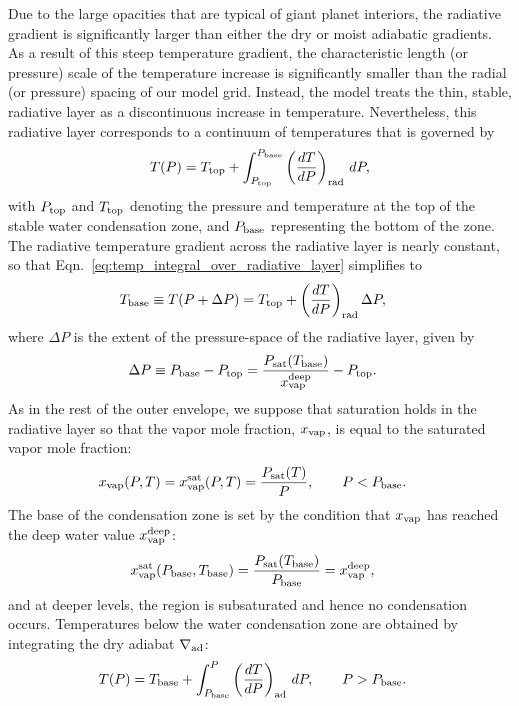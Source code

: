 \documentclass[11pt]{ucscthesisbs}
\begin{document}
Due to the large opacities that are typical of giant planet interiors, the radiative gradient is significantly larger than either the dry or moist adiabatic gradients. As a result of this steep temperature gradient, the characteristic length (or pressure) scale of the temperature increase is significantly smaller than the radial (or pressure) spacing of our model grid. Instead, the model treats the thin, stable, radiative layer as a discontinuous increase in temperature. Nevertheless, this radiative layer corresponds to a continuum of temperatures that is governed by
\begin{equation}
  T(P) = T_{\rm top} + \int_{P_{\rm top}}^{P_{\rm base}} \left(\frac{dT}{dP}\right)_{\rm rad}\,d P ,
  \label{eq:temp_integral_over_radiative_layer}
\end{equation}
with $P_{\rm top}$ and $T_{\rm top}$ denoting the pressure and temperature at the top of the stable water condensation zone, and $P_{\rm base}$ representing the bottom of the zone. The radiative temperature gradient across the radiative layer is nearly constant, so that Eqn.~\ref{eq:temp_integral_over_radiative_layer} simplifies to
\begin{align}
T_{\rm base}\equiv T(P+\Delta P) &= T_{\rm top} + \left(\frac{dT}{dP}\right)_{\rm rad}\Delta P ,
\label{eq:temperature_profile_over_radiative_layer_simplification}
\end{align}
where $\Delta P$ is the extent of the pressure-space of the radiative layer, given by
\begin{align}
\Delta P \equiv P_{\rm base}-P_{\rm top} &= \frac{P_{\rm sat}(T_{\rm base})}{x_{\rm vap}^{\rm deep}} - P_{\rm top}.
\label{eq:delta_P_over_radiative_layer}
\end{align}
As in the rest of the outer envelope, we suppose that saturation holds in the radiative layer so that the vapor mole fraction, $x_{\rm vap}$, is equal to the saturated vapor mole fraction:
\begin{align}
x_{\rm vap}(P, T) &= x_{\rm vap}^{\rm sat}(P, T) = \frac{P_{\rm sat}(T)}{P}, \qquad P<P_{\rm base}.
\label{eq:vapor_mole_fraction_within_condensation_zone}
\end{align}
The base of the condensation zone is set by the condition that $x_{\rm vap}$ has reached the deep water value $x_{\rm vap}^{\rm deep}$:
\begin{align}
x_{\rm vap}^{\rm sat}(P_{\rm base}, T_{\rm base}) &= \frac{P_{\rm sat}(T_{\rm base})}{P_{\rm base}}=x_{\rm vap}^{\rm deep},
\label{eq:cloud_base}
\end{align}
and at deeper levels, the region is subsaturated and hence no condensation occurs. Temperatures below the water condensation zone are obtained by integrating the dry adiabat $\nabla_{\rm ad}$:
\begin{align}
T(P) &= T_{\rm base} + \int_{P_{\rm base}}^P\left(\frac{dT}{dP}\right)_{\rm ad}\,d P, \qquad  P>P_{\rm base} .
\label{eq:dry_adiabat_integration}
\end{align}
\end{document}
